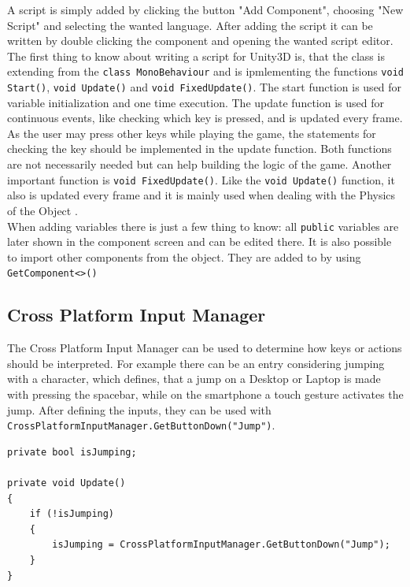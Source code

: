 \documentclass[conference]{IEEEtran}
\begin{document}
A script is simply added by clicking the button "Add Component", choosing "New Script" and selecting the wanted language. After adding the script it can be written by double clicking the component and opening the wanted script editor. \\
The first thing to know about writing a script for Unity3D is, that the class is extending from the \lstinline!class MonoBehaviour! and is ipmlementing the functions \lstinline!void Start()!, \lstinline!void Update()! and \lstinline!void FixedUpdate()!. 
The start function is used for variable initialization and one time execution.
The update function is used for continuous events, like checking which key is pressed, and is updated every frame\cite{b1}. As the user may press other keys while playing the game, the statements for checking the key should be implemented in the update function. Both functions are not necessarily needed but can help building the logic of the game.
Another important function is \lstinline!void FixedUpdate()!. Like the \lstinline!void Update()! function, it also is updated every frame and it is mainly used when dealing with the Physics of the Object \cite{b1}. \\
When adding variables there is just a few thing to know: all \lstinline!public! variables are later shown in the component screen and can be edited there. It is also possible to import other components from the object. They are added to by using \lstinline!GetComponent<>()!

\subsection{Cross Platform Input Manager}

The Cross Platform Input Manager can be used to determine how keys or actions should be interpreted. For example there can be an entry considering jumping with a character, which defines, that a jump on a Desktop or Laptop is made with pressing the spacebar, while on the smartphone a touch gesture activates the jump. After defining the inputs, they can be used with \lstinline!CrossPlatformInputManager.GetButtonDown("Jump")!. \\

\begin{lstlisting}[caption=Example Implementation for Determining a Jump,label=list:character_controls_jump_implementation]
private bool isJumping;

private void Update()
{
	if (!isJumping)
	{
		isJumping = CrossPlatformInputManager.GetButtonDown("Jump");
	}
}
\end{lstlisting}
\end{document}
